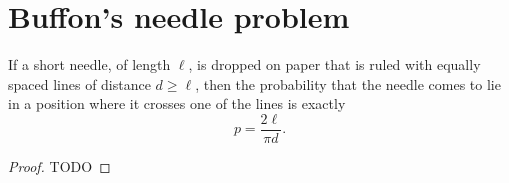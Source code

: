 \chapter{Buffon's needle problem}

\begin{theorem}
  \label{buffon_needle}
  If a short needle, of length $\ell$, is dropped on paper that is ruled with
  equally spaced lines of distance $d \geq \ell$, then the probability that the
  needle comes to lie in a position where it crosses one of the lines is exactly
  \[
  p = \frac{2 \ell}{\pi d}.
  \]
\end{theorem}
\begin{proof}
  TODO
\end{proof}
